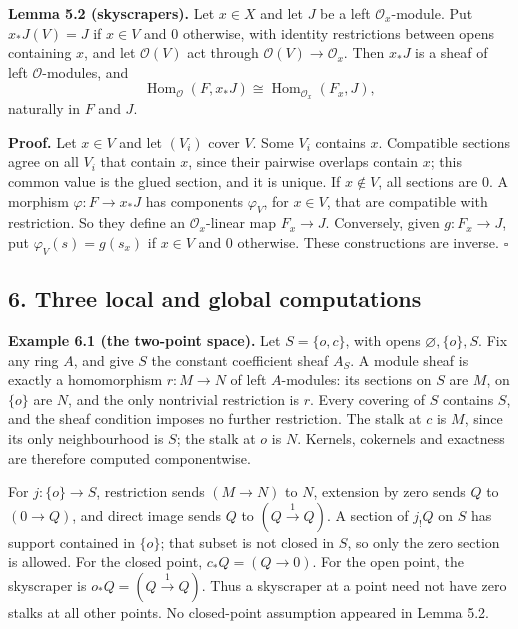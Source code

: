 \documentclass[
  english,
  11pt,
  a4paper,
]{article}
\begin{document}
\textbf{Lemma 5.2 (skyscrapers).} Let \(x\in X\) and let \(J\) be a left
\(\mathcal O_x\)-module. Put \(x_*J(V)=J\) if \(x\in V\) and \(0\)
otherwise, with identity restrictions between opens containing \(x\),
and let \(\mathcal O(V)\) act through \(\mathcal O(V)\to\mathcal O_x\).
Then \(x_*J\) is a sheaf of left \(\mathcal O\)-modules, and
\[\operatorname{Hom}_{\mathcal O}(F,x_*J)\cong\operatorname{Hom}_{\mathcal O_x}(F_x,J),
\tag{5.2}\] naturally in \(F\) and \(J\).

\textbf{Proof.} Let \(x\in V\) and let \((V_i)\) cover \(V\). Some
\(V_i\) contains \(x\). Compatible sections agree on all \(V_i\) that
contain \(x\), since their pairwise overlaps contain \(x\); this common
value is the glued section, and it is unique. If \(x\notin V\), all
sections are \(0\). A morphism \(\varphi:F\to x_*J\) has components
\(\varphi_V\), for \(x\in V\), that are compatible with restriction. So
they define an \(\mathcal O_x\)-linear map \(F_x\to J\). Conversely,
given \(g:F_x\to J\), put \(\varphi_V(s)=g(s_x)\) if \(x\in V\) and
\(0\) otherwise. These constructions are inverse. \(\square\)

\subsection{6. Three local and global
computations}\label{sheaves-of-modules-on-a-ringed-space--6-three-local-and-global-computations}

\textbf{Example 6.1 (the two-point space).} Let \(S=\{o,c\}\), with
opens \(\varnothing,\{o\},S\). Fix any ring \(A\), and give \(S\) the
constant coefficient sheaf \(A_S\). A module sheaf is exactly a
homomorphism \(r:M\to N\) of left \(A\)-modules: its sections on \(S\)
are \(M\), on \(\{o\}\) are \(N\), and the only nontrivial restriction
is \(r\). Every covering of \(S\) contains \(S\), and the sheaf
condition imposes no further restriction. The stalk at \(c\) is \(M\),
since its only neighbourhood is \(S\); the stalk at \(o\) is \(N\).
Kernels, cokernels and exactness are therefore computed componentwise.

For \(j:\{o\}\to S\), restriction sends \((M\to N)\) to \(N\), extension
by zero sends \(Q\) to \((0\to Q)\), and direct image sends \(Q\) to
\((Q\xrightarrow{1}Q)\). A section of \(j_!Q\) on \(S\) has support
contained in \(\{o\}\); that subset is not closed in \(S\), so only the
zero section is allowed. For the closed point, \(c_*Q=(Q\to0)\). For the
open point, the skyscraper is \(o_*Q=(Q\xrightarrow{1}Q)\). Thus a
skyscraper at a point need not have zero stalks at all other points. No
closed-point assumption appeared in Lemma 5.2.
\end{document}
